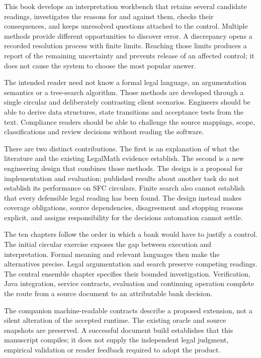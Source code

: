 \documentclass[12pt,a4paper,oneside,openany]{book}
\begin{document}
This book develops an interpretation workbench that retains several candidate
readings, investigates the reasons for and against them, checks their consequences,
and keeps unresolved questions attached to the control. Multiple methods provide
different opportunities to discover error. A discrepancy opens a recorded
resolution process with finite limits. Reaching those limits produces a report
of the remaining uncertainty and prevents release of an affected control; it does
not cause the system to choose the most popular answer.

The intended reader need not know a formal legal language, an argumentation
semantics or a tree-search algorithm. Those methods are developed through a
single circular and deliberately contrasting client scenarios. Engineers should
be able to derive data structures, state transitions and acceptance tests from
the text. Compliance readers should be able to challenge the source mappings,
scope, classifications and review decisions without reading the software.

There are two distinct contributions. The first is an explanation of what the
literature and the existing LegalMath evidence establish. The second is a new
engineering design that combines those methods. The design is a proposal for
implementation and evaluation; published results about another task do not
establish its performance on SFC circulars. Finite search also cannot establish
that every defensible legal reading has been found. The design instead makes
coverage obligations, source dependencies, disagreement and stopping reasons
explicit, and assigns responsibility for the decisions automation cannot settle.

The ten chapters follow the order in which a bank would have to justify a
control. The initial circular exercise exposes the gap between execution and
interpretation. Formal meaning and relevant languages then make the alternatives
precise. Legal argumentation and search preserve competing readings. The central
ensemble chapter specifies their bounded investigation. Verification, Java
integration, service contracts, evaluation and continuing operation complete the
route from a source document to an attributable bank decision.

The companion machine-readable contracts describe a proposed extension, not a
silent alteration of the accepted runtime. The existing oracle and source
snapshots are preserved. A successful document build establishes that this
manuscript compiles; it does not supply the independent legal judgment, empirical
validation or reader feedback required to adopt the product.
\tableofcontents
\mainmatter
\end{document}
